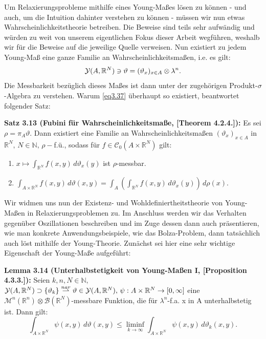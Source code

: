 Um Relaxierungsprobleme mithilfe eines Young-Maßes lösen zu können - und auch, um die Intuition dahinter verstehen zu können - müssen wir nun etwas Wahrscheinlichkeitstheorie betreiben. Die Beweise sind teils sehr aufwändig und würden zu weit von unserem eigentlichen Fokus dieser Arbeit wegführen, weshalb wir für die Beweise auf die jeweilige Quelle verweisen. Nun existiert zu jedem Young-Maß eine ganze Familie an Wahrscheinlichkeitsmaßen, i.e. es gilt:
\begin{equation}{\label{eq3.37}}
    \mathcal{Y}(A,\mathbb{R}^N) \ni \vartheta = (\vartheta_x)_{x \in A} \otimes \lambda^n.
\end{equation}
Die Messbarkeit bezüglich dieses Maßes ist dann unter der zugehörigen Produkt-\(\sigma\)-Algebra zu verstehen. Warum \eqref{eq3.37} überhaupt so existiert, beantwortet folgender Satz:\\[0.5cm]
\colorbox{generalYellow}{\begin{minipage}{16cm}{\textcolor{black}{}{\label{theo3.13}}}
\textbf{Satz 3.13 (Fubini für Wahrscheinlichkeitsmaße, \cite{AttouchCalcVar}[Theorem 4.2.4.]):} Es sei \(\rho = \pi_A \vartheta\). Dann existiert eine Familie an Wahrscheinlichkeitsmaßen \((\vartheta_x)_{x \in A}\) in \(\mathbb{R}^N, \, N \in \mathbb{N}, \, \rho-\)f.ü., sodass für \(f \in \mathcal{C}_0 (A \times \mathbb{R}^N)\) gilt:
\begin{enumerate}
    \item \(x \mapsto \int_{\mathbb{R}^N} f(x,y) \, d\vartheta_x(y)\) ist \(\rho\)-messbar.
    \item \(\int_{A \times \mathbb{R}^N} f(x,y) \, d\vartheta(x,y) = \int_A (\int_{\mathbb{R}^N} f(x,y) \, d\vartheta_x(y))\, d\rho(x)\).
\end{enumerate}
\end{minipage}}

Wir widmen uns nun der Existenz- und Wohldefiniertheitstheorie von Young-Maßen in Relaxierungsproblemen zu. Im Anschluss werden wir das Verhalten gegenüber Oszillationen beschreiben und im Zuge dessen dann auch präsentieren, wie man konkrete Anwendungsbeispiele, wie das Bolza-Problem, dann tatsächlich auch löst mithilfe der Young-Theorie. Zunächst sei hier eine sehr wichtige Eigenschaft der Young-Maße aufgeführt:\\[0.5cm]
\colorbox{generalYellow}{\begin{minipage}{16cm}{\textcolor{black}{}{\label{lem3.14}}}
\textbf{Lemma 3.14 (Unterhalbstetigkeit von Young-Maßen I, \cite{AttouchCalcVar}[Proposition 4.3.3.]):} Seien \(k,n,N \in \mathbb{N}, \, \) \(\mathcal{Y}(A,\mathbb{R}^N) \supset \{\vartheta_k\} \stackrel{nar}{\rightharpoonup} \vartheta \in \mathcal{Y}(A,\mathbb{R}^N), \, \psi : A \times \mathbb{R}^N \to [0,\infty]\) eine \(\mathcal{M}^n(\mathbb{R}^n) \otimes \mathcal{B}(\mathbb{R}^N)\)-messbare Funktion, die für \(\lambda^n\)-f.a. x in A unterhalbstetig ist. Dann gilt:
\begin{equation}
    \int_{A \times \mathbb{R}^N} \psi(x,y) \, d\vartheta(x,y) \leq \liminf_{k \to \infty} \int_{A \times \mathbb{R}^N} \psi(x,y) \, d\vartheta_k(x,y). 
\end{equation}
\end{minipage}}

